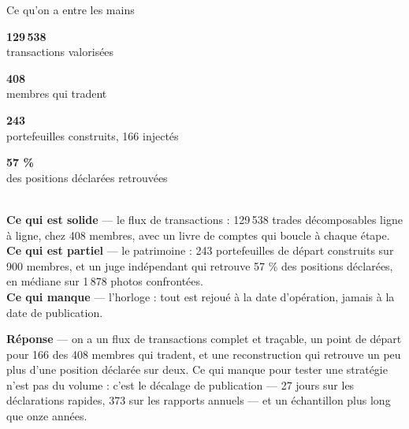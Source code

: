 \documentclass[11pt,aspectratio=169]{beamer}
\newcommand{\tuile}[3]{%
  \begin{minipage}[t]{0.23\textwidth}\centering
    \colorbox{#1}{\parbox[c][20mm][c]{\dimexpr\linewidth-8pt}{\centering
      {\color{white}\Large\textbf{#2}}\\[0.5mm]{\color{white}\footnotesize #3}}}
  \end{minipage}}
\newcommand{\repband}[1]{%
  \colorbox{okgreen!12}{\parbox{\dimexpr\textwidth-10pt}{\scriptsize
    \textbf{\textcolor{okgreen}{Réponse}}\; --- #1}}}
\begin{document}
\begin{frame}{Ce qu'on a entre les mains}
  \centering
  \tuile{helec}{129\,538}{transactions valorisées}
  \tuile{helec}{408}{membres qui tradent}
  \tuile{okgreen}{243}{portefeuilles construits, 166 injectés}
  \tuile{okgreen}{57 \%}{des positions déclarées retrouvées}\\[5mm]
  {\footnotesize
  \textbf{Ce qui est solide} --- le flux de transactions : 129\,538 trades décomposables ligne à
  ligne, chez 408 membres, avec un livre de comptes qui boucle à chaque étape.\\[1.5mm]
  \textbf{Ce qui est partiel} --- le patrimoine : 243 portefeuilles de départ construits sur
  900 membres, et un juge indépendant qui retrouve 57 \% des positions déclarées, en médiane
  sur 1\,878 photos confrontées.\\[1.5mm]
  \textbf{Ce qui manque} --- l'horloge : tout est rejoué à la date d'opération, jamais à la date
  de publication.}\\[4mm]
  \repband{on a un flux de transactions complet et traçable, un point de départ pour 166 des
  408 membres qui tradent, et une reconstruction qui retrouve un peu plus d'une position déclarée
  sur deux. Ce qui manque pour tester une stratégie n'est pas du volume : c'est le décalage de
  publication --- 27 jours sur les déclarations rapides, 373 sur les rapports annuels --- et un
  échantillon plus long que onze années.}
\end{frame}
\end{document}
